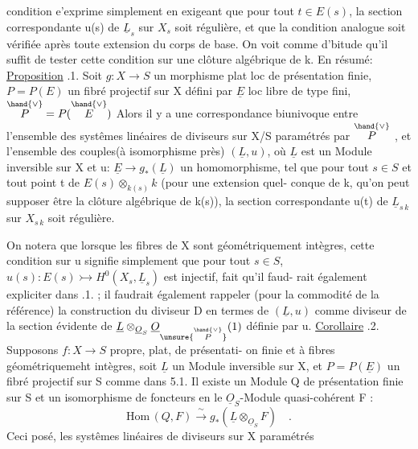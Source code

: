 
condition e'exprime simplement en exigeant que pour tout $t\in E(s)$,
la section correspondante u(s) de $\underline{L}_s$ sur $X_s$ soit régulière, et que la
condition analogue soit vérifiée après toute extension du corps de base.
On voit comme d'bitude qu'il suffit de tester cette condition sur une
clôture algébrique de k. En résumé:
\uline{Proposition} .1. Soit $g:X\to S$ un morphisme plat loc de présentation
finie, $P=P(E)$ un fibré projectif sur X défini par $\underline{E}$ loc libre de type
fini, $\overset{\hand{\vee}}{P} = P(\overset{\hand{\vee}}{E})$ \hand{,} Alors il y a une correspondance biunivoque entre
l'ensemble des systêmes linéaires de diviseurs sur X/S paramétrés par $\overset{\hand{\vee}}{P}$ ,
et l'ensemble des couples(à isomorphisme près) $(\underline{L},u)$, où $\underline{L}$ est un
Module inversible sur X et u: $\underline{E}\to g_*(\underline{L})$ un homomorphisme, tel que
pour tout $s\in S$ et tout point t de $E(s)\otimes_{k(s)}k$ (pour une extension quel-%
\margin{$\cdot$} conque de k, qu'on peut supposer être la clôture algébrique de k(s)),
la section correspondante u(t) de $\underline{L}_{s\,k}$ sur $X_{s\,k}$ soit régulière.

On notera que lorsque les fibres de X sont 
géométriquement intègres, cette condition sur u signifie simplement que
pour tout $s\in S$, $u(s): E(s)\rightarrowtail H^{0}(X_s,\underline{L}_s)$ est injectif, fait qu'il faud-%
rait également expliciter dans .1. ;  il faudrait également rappeler
(pour la commodité de la référence) la construction du diviseur D en
termes de $(\underline{L},u)$ comme diviseur de la section évidente \inserted{$\phi$} de $\underline{L}\otimes_{\underline{O}_S}\underline{O}_{\unsure{\overset{\hand{\vee}}{P}}}(1)$
définie par u.
\uline{Corollaire} .2.  Supposons $f: X\longrightarrow S$ propre, plat, de présentati-%
on finie et à fibres géométriquemeht intègres,  soit $\underline{L}$ un Module
inversible sur X, et $P=P(\underline{E})$ un fibré projectif sur S comme dans 5.1.
 Il existe un Module Q de présentation finie sur S et un
isomorphisme de foncteurs en le $\underline{O}_S$-Module quasi-cohérent F :
\[ \mathrm{Hom}\,(Q,F) \xrightarrow{\ \sim\ } g_*(\underline{L}\otimes_{\underline{O}_S}F) \quad . \]
Ceci posé, les  systêmes linéaires de diviseurs sur X paramétrés

